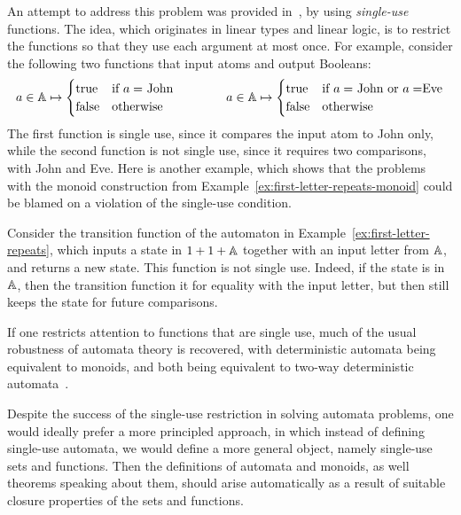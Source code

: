 An attempt to address this problem was provided in~\cite{stefansk-msc,stefanski-phd,bojanczykstefanski2020}, by using \emph{single-use} functions. The idea, which originates in linear types and linear logic,  is to restrict the functions so that they use each argument at most once. For example, consider the following two functions that input atoms and output Booleans:
\begin{align*}
a \in \mathbb A \mapsto 
\begin{cases}
    \text{true} & \text{if $a=$ John}\\
    \text{false} & \text{otherwise}
\end{cases}
\qquad \qquad 
a \in \mathbb A \mapsto 
\begin{cases}
    \text{true} & \text{if $a=$ John or $a = $Eve}\\
    \text{false} & \text{otherwise}
\end{cases}
\end{align*}
The first function is single use, since it compares the input atom to John only, while the second function is not single use, since it requires two comparisons, with John and Eve. Here is another example, which shows that the problems with the monoid construction from Example~\ref{ex:first-letter-repeats-monoid} could be blamed on a violation of the single-use condition.
\begin{example}
    Consider  the transition function of the automaton in Example~\ref{ex:first-letter-repeats}, which inputs a state in $1 + 1 + \mathbb A$ together with an input letter from $\mathbb A$, and returns a new state.  This function is not single use. Indeed, if the state is in $\mathbb A$, then the transition function it for equality with the input letter, but then still keeps the state for future comparisons. \exampleend
\end{example}

If one restricts attention to functions that are single use, much of the usual robustness of automata theory is recovered, with deterministic automata being equivalent to monoids, and both being equivalent to two-way deterministic automata~\cite{bojanczykstefanski2020}.

Despite the success of the single-use restriction in solving automata problems, one would ideally prefer a more principled approach, in which instead of defining single-use automata, we would define a more general object, namely single-use sets and functions. Then the definitions of  automata and monoids, as well theorems speaking about them, should arise automatically as a result of suitable closure properties of the sets and functions.

